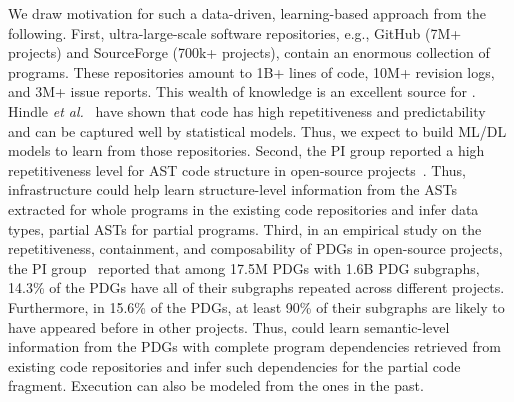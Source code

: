 We draw motivation for such a data-driven, learning-based approach from the following. First, ultra-large-scale software repositories, e.g., GitHub (7M+ projects) and SourceForge (700k+ projects), contain an enormous collection of programs. These repositories amount to 1B+ lines of code, 10M+ revision logs, and 3M+ issue reports. This wealth of knowledge is an excellent source for {\tool}. Hindle {\em et al.}~\cite{naturalness-icse12} have shown that code has high repetitiveness and predictability and can be captured well by statistical models. Thus, we expect to build ML/DL models to learn from those repositories. 
Second, the PI group reported a high repetitiveness level for AST code structure in open-source projects~\cite{icse15}. Thus, {\tool} infrastructure could help learn structure-level information from the ASTs extracted for whole programs in the existing code repositories and infer data types, partial ASTs for partial programs. Third, in an empirical study on the repetitiveness, containment, and composability of PDGs in open-source projects, the PI group~\cite{msr16} reported that among 17.5M PDGs with 1.6B PDG subgraphs, 14.3\% of the PDGs have all of their subgraphs repeated across different projects. Furthermore, in 15.6\% of the PDGs, at least 90\% of their subgraphs are likely to have appeared before in other projects. 
Thus, {\tool} could learn semantic-level information from the PDGs with complete program dependencies retrieved from existing code repositories and infer such dependencies for the partial code fragment. Execution can also be modeled
from the ones in the past.



